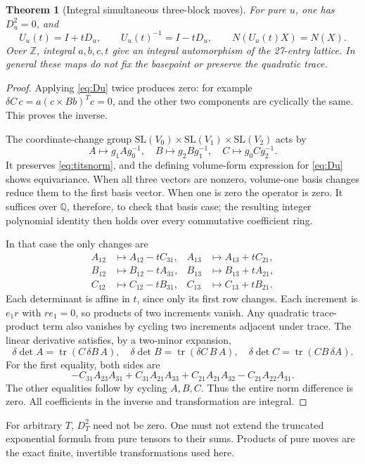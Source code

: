 \documentclass[11pt,reqno]{amsart}
\newtheorem{theorem}{Theorem}[section]
\theoremstyle{definition}\newtheorem{definition}[theorem]{Definition}
\theoremstyle{remark}\newtheorem{remark}[theorem]{Remark}
\newcommand{\Q}{\mathbb Q}\newcommand{\R}{\mathbb R}\newcommand{\C}{\mathbb C}\newcommand{\Z}{\mathbb Z}\newcommand{\OO}{\mathbb O}
\DeclareMathOperator{\tr}{tr}\DeclareMathOperator{\Tr}{Tr}\DeclareMathOperator{\Ann}{Ann}\DeclareMathOperator{\Fix}{Fix}\DeclareMathOperator{\diag}{diag}\DeclareMathOperator{\lcm}{lcm}\DeclareMathOperator{\Ree}{Re}\DeclareMathOperator{\Jac}{Jac}\DeclareMathOperator{\Pic}{Pic}
\begin{document}
\begin{theorem}[Integral simultaneous three-block moves]\label{thm:move}
For pure $u$, one has $D_u^2=0$, and
\[
 U_u(t)=I+tD_u,\qquad U_u(t)^{-1}=I-tD_u,
 \qquad N(U_u(t)X)=N(X).
\]
Over $\Z$, integral $a,b,c,t$ give an integral automorphism of the 27-entry
lattice. In general these maps do not fix the basepoint or preserve the
quadratic trace.
\end{theorem}
\begin{proof}
Applying \eqref{eq:Du} twice produces zero: for example
$\delta C\,c=a(c\times Bb)^Tc=0$, and the other two components are cyclically
the same. This proves the inverse.

The coordinate-change group $\mathrm{SL}(V_0)\times\mathrm{SL}(V_1)\times
\mathrm{SL}(V_2)$ acts by
\[
 A\mapsto g_1Ag_0^{-1},\quad B\mapsto g_2Bg_1^{-1},\quad
 C\mapsto g_0Cg_2^{-1}.
\]
It preserves \eqref{eq:titsnorm}, and the defining volume-form expression for
\eqref{eq:Du} shows equivariance. When all three vectors are nonzero, volume-one
basis changes reduce them to the first basis vector. When one is zero the
operator is zero. It suffices over $\Q$, therefore, to check that basis case;
the resulting integer polynomial identity then holds over every commutative
coefficient ring.

In that case the only changes are
\begin{align*}
 A_{12}&\mapsto A_{12}-tC_{31},& A_{13}&\mapsto A_{13}+tC_{21},\\
 B_{12}&\mapsto B_{12}-tA_{31},& B_{13}&\mapsto B_{13}+tA_{21},\\
 C_{12}&\mapsto C_{12}-tB_{31},& C_{13}&\mapsto C_{13}+tB_{21}.
\end{align*}
Each determinant is affine in $t$, since only its first row changes. Each
increment is $e_1r$ with $r e_1=0$, so products of two increments vanish.
Any quadratic trace-product term also vanishes by cycling two increments
adjacent under trace. The linear derivative satisfies, by a two-minor expansion,
\[
 \delta\det A=\tr(C\,\delta B\,A),\quad
 \delta\det B=\tr(\delta C\,B\,A),\quad
 \delta\det C=\tr(CB\,\delta A).
\]
For the first equality, both sides are
\[
 -C_{31}A_{23}A_{31}+C_{31}A_{21}A_{33}
 +C_{21}A_{21}A_{32}-C_{21}A_{22}A_{31}.
\]
The other equalities follow by cycling $A,B,C$. Thus the entire norm difference
is zero. All coefficients in the inverse and transformation are integral.
\end{proof}

For arbitrary $T$, $D_T^2$ need not be zero. One must not extend the truncated
exponential formula from pure tensors to their sums. Products of pure moves
are the exact finite, invertible transformations used here.
\end{document}
